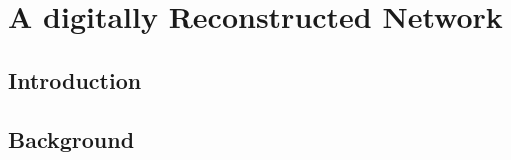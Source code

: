 \documentclass{beamer}
\begin{document}

\section{A digitally Reconstructed Network} %


\subsection{Introduction}%

\subsection{Background}%
\end{document}
